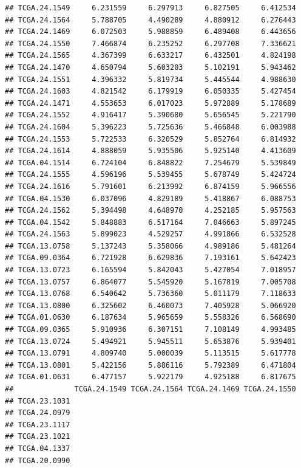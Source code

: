 \documentclass[UTF8]{beamer}\usepackage[]{graphicx}\usepackage[]{color}
\makeatletter
\newenvironment{kframe}{%
 \def\at@end@of@kframe{}%
 \ifinner\ifhmode%
  \def\at@end@of@kframe{\end{minipage}}%
  \begin{minipage}{\columnwidth}%
 \fi\fi%
 \def\FrameCommand##1{\hskip\@totalleftmargin \hskip-\fboxsep
 \colorbox{shadecolor}{##1}\hskip-\fboxsep
     \hskip-\linewidth \hskip-\@totalleftmargin \hskip\columnwidth}%
 \MakeFramed {\advance\hsize-\width
   \@totalleftmargin\z@ \linewidth\hsize
   \@setminipage}}%
 {\par\unskip\endMakeFramed%
 \at@end@of@kframe}
\newenvironment{knitrout}{}{} %
\makeatother
\begin{document}
\begin{frame}[fragile]
\begin{knitrout}
\begin{kframe}
\begin{verbatim}
## TCGA.24.1549     6.231559     6.297913     6.827505     6.412534
## TCGA.24.1564     5.788705     4.490289     4.880912     6.276443
## TCGA.24.1469     6.072503     5.988859     6.489408     6.443656
## TCGA.24.1550     7.466874     6.235252     6.297708     7.336621
## TCGA.24.1565     4.367399     6.633217     6.432501     4.824198
## TCGA.24.1470     4.650794     5.603203     5.102191     5.943462
## TCGA.24.1551     4.396332     5.819734     5.445544     4.988630
## TCGA.24.1603     4.821542     6.179919     6.050335     5.427454
## TCGA.24.1471     4.553653     6.017023     5.972889     5.178689
## TCGA.24.1552     4.916417     5.390680     5.656545     5.221790
## TCGA.24.1604     5.396223     5.725636     5.466848     6.003988
## TCGA.24.1553     5.722533     6.320529     5.852764     6.814932
## TCGA.24.1614     4.888059     5.935506     5.925140     4.413609
## TCGA.04.1514     6.724104     6.848822     7.254679     5.539849
## TCGA.24.1555     4.596196     5.539455     5.678749     5.424724
## TCGA.24.1616     5.791601     6.213992     6.874159     5.966556
## TCGA.04.1530     6.037096     4.829189     5.418867     6.088753
## TCGA.24.1562     5.394498     4.648970     4.252185     5.957563
## TCGA.04.1542     5.848883     6.517164     7.046663     5.897245
## TCGA.24.1563     5.899023     4.529257     4.991866     6.532528
## TCGA.13.0758     5.137243     5.358066     4.989186     5.481264
## TCGA.09.0364     6.721928     6.629836     7.193161     5.642423
## TCGA.13.0723     6.165594     5.842043     5.427054     7.018957
## TCGA.13.0757     6.864077     5.545920     5.167819     7.005708
## TCGA.13.0768     6.540642     5.736360     5.011179     7.118633
## TCGA.13.0800     6.325602     6.460073     7.405928     5.066920
## TCGA.01.0630     6.187634     5.965659     5.558326     6.568690
## TCGA.09.0365     5.910936     6.307151     7.108149     4.993485
## TCGA.13.0724     5.494921     5.945511     5.653876     5.939401
## TCGA.13.0791     4.809740     5.000039     5.113515     5.617778
## TCGA.13.0801     5.422156     5.886116     5.792389     6.471804
## TCGA.01.0631     6.477157     5.922179     4.925188     6.817675
##              TCGA.24.1549 TCGA.24.1564 TCGA.24.1469 TCGA.24.1550
## TCGA.23.1031                                                    
## TCGA.24.0979                                                    
## TCGA.23.1117                                                    
## TCGA.23.1021                                                    
## TCGA.04.1337                                                    
## TCGA.20.0990                                                    

\end{verbatim}
\end{kframe}
\end{knitrout}
\end{frame}
\end{document}
